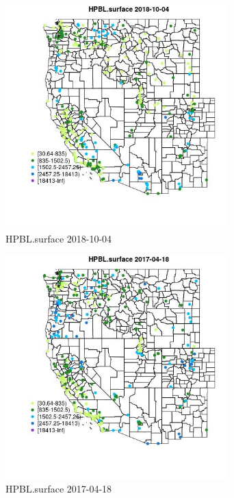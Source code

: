 \begin{figure} 
\centering  
\includegraphics[width=0.77\textwidth]{Code_Outputs/Report_ML_input_PM25_Step4_part_f_de_duplicated_aves_prioritize_24hr_obswNAs_MapObsHPBLsurface2018-10-04.jpg} 
\caption{\label{fig:Report_ML_input_PM25_Step4_part_f_de_duplicated_aves_prioritize_24hr_obswNAsMapObsHPBLsurface2018-10-04}HPBL.surface 2018-10-04} 
\end{figure} 
 

\begin{figure} 
\centering  
\includegraphics[width=0.77\textwidth]{Code_Outputs/Report_ML_input_PM25_Step4_part_f_de_duplicated_aves_prioritize_24hr_obswNAs_MapObsHPBLsurface2017-04-18.jpg} 
\caption{\label{fig:Report_ML_input_PM25_Step4_part_f_de_duplicated_aves_prioritize_24hr_obswNAsMapObsHPBLsurface2017-04-18}HPBL.surface 2017-04-18} 
\end{figure} 
 

